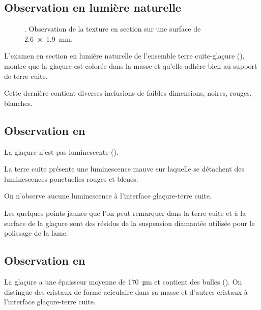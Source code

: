 \subsection{Observation en lumière naturelle}
\begin{figure}[htb]
  \begin{minipage}[t]{0.4\textwidth}
  \end{minipage}
  \begin{minipage}[t]{0.4\textwidth}
    \subcaption{\CL \label{texture:6530_CL}}
  \end{minipage}
  \caption[\ -- Observation de la texture en section]
          {\legendeC. 
           Observation de la texture en section sur une surface de 
           \SI{2.6x1.9}{\mm}.}
  \label{texture:6530}
\end{figure}

L'examen en section en lumière naturelle de l'ensemble terre 
cuite-glaçure (), montre que la glaçure est 
colorée dans la masse et qu'elle adhère bien au support de terre cuite.

Cette dernière contient diverses inclusions de faibles dimensions,
noires, rouges, blanches.

\subsection{Observation en \CL}
La glaçure n'est pas luminescente ().

La terre cuite présente une luminescence mauve sur laquelle se 
détachent des luminescences ponctuelles rouges et bleues.

On n'observe aucune luminescence à l'interface glaçure-terre cuite.

Les quelques points jaunes que l'on peut remarquer dans la terre cuite 
et à la surface de la glaçure sont des résidus de la suspension 
diamantée utilisée pour le polissage de la lame.

\subsection{Observation en \MEB[ie]}
La glaçure a une épaisseur moyenne de \SI{170}{\um} et contient 
des bulles (). On distingue des cristaux de 
forme aciculaire dans sa masse et d'autres cristaux à l'interface 
glaçure-terre cuite.

